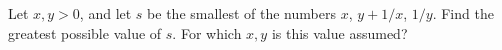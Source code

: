 Let $x, y > 0$, and let $s$ be the smallest of the numbers $x$, $y + 1/x$, $1/y$. Find the greatest possible value of $s$. For which $x, y$ is this value assumed?
